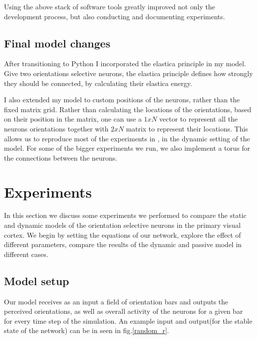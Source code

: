 Using the above stack of software tools greatly improved not only the development process, but also conducting and documenting experiments.

\section{Final model changes}
After transitioning to Python I incorporated the elastica principle in my model. Give two orientations selective neurons, the elastica principle defines how strongly they should be connected, by calculating their elastica energy.

I also extended my model to custom positions of the neurons, rather than the fixed matrix grid. Rather than calculating the locations of the orientations, based on their position in the matrix, one can use a $1xN$ vector to represent all the neurons orientations together with $2xN$ matrix to represent their locations. This allows us to reproduce most of the experiments in \cite{keemink2015unified}, in the dynamic setting of the model. For some of the bigger experiments we run, we also implement a torus for the connections between the neurons.


\chapter{Experiments}






In this section we discuss some experiments we performed to compare the static and dynamic models of the orientation selective neurons in the primary visual cortex. We begin by setting the equations of our network, explore the effect of different parameters, compare the results of the dynamic and passive model in different cases.

\section{Model setup}

Our model receives as an input a field of orientation bars and outputs the perceived orientations, as well as overall activity of the neurons for a given bar for every time step of the simulation. An example input and output(for the stable state of the network) can be in seen in fig.\ref{random_r}.


